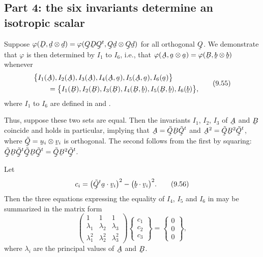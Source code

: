 \subsection*{Part 4: the six invariants determine an isotropic scalar}

Suppose $\varphi(\bD,\bd\otimes\bd)
=\varphi(\bQ\bD\bQ^{t},\bQ\bd\otimes\bQ\bd)$ for all orthogonal $\bQ$.
We demonstrate that $\varphi$ is then determined by $I_{1}$ to $I_{6}$,
i.e., that $\varphi(\bA,\ba\otimes\ba)=\varphi(\bB,\bb\otimes\bb)$
whenever
\begin{equation}
\begin{aligned}
   &\big\{I_{1}(\bA),I_{2}(\bA),I_{3}(\bA),
     I_{4}(\bA,\ba),I_{5}(\bA,\ba),I_{6}(\ba)\big\}\\
   &\qquad=\big\{I_{1}(\bB),I_{2}(\bB),I_{3}(\bB),
     I_{4}(\bB,\bb),I_{5}(\bB,\bb),I_{6}(\bb)\big\},
\end{aligned}
   \tag{9.55}\label{eq:9.55}
\end{equation}
where $I_{1}$ to $I_{6}$ are defined in  and .

Thus, suppose these two sets are equal. Then the invariants $I_{1}$,
$I_{2}$, $I_{3}$ of $\bA$ and $\bB$ coincide and  holds in
particular, implying that $\bA=\tilde\bQ\bB\tilde\bQ^{t}$ and
$\bA^{2}=\tilde\bQ\bB^{2}\tilde\bQ^{t}$, where
$\tilde\bQ=\bu_{i}\otimes\bv_{i}$ is orthogonal. The second follows from
the first by squaring:
$\tilde\bQ\bB\tilde\bQ^{t}\tilde\bQ\bB\tilde\bQ^{t}
=\tilde\bQ\bB^{2}\tilde\bQ^{t}$.

Let
\begin{equation}
   c_{i}=\big(\ip{\tilde\bQ^{t}\ba}{\bv_{i}}\big)^{2}
        -\big(\ip\bb{\bv_{i}}\big)^{2}.
   \tag{9.56}\label{eq:9.56}
\end{equation}
Then the three equations expressing the equality of $I_{4}$, $I_{5}$ and
$I_{6}$ in  may be summarized in the matrix form
\begin{equation}
   \begin{pmatrix}
     1&1&1\\
     \lambda_{1}&\lambda_{2}&\lambda_{3}\\
     \lambda_{1}^{2}&\lambda_{2}^{2}&\lambda_{3}^{2}
   \end{pmatrix}
   \begin{Bmatrix}c_{1}\\ c_{2}\\ c_{3}\end{Bmatrix}
   =\begin{Bmatrix}0\\ 0\\ 0\end{Bmatrix},
   \tag{9.57}\label{eq:9.57}
\end{equation}
where $\lambda_{i}$ are the principal values of $\bA$ and $\bB$.

